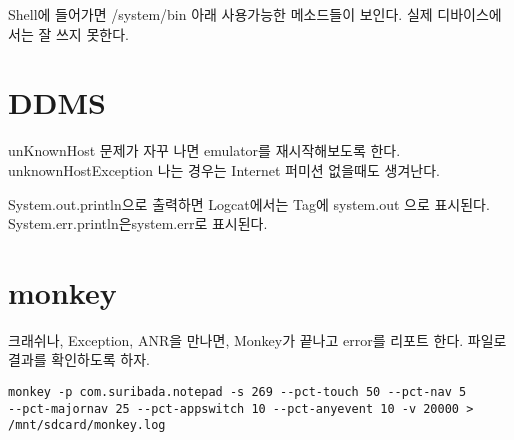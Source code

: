 Shell에 들어가면 /system/bin 아래 사용가능한 메소드들이 보인다. 실제 디바이스에서는 잘 쓰지 못한다.

\section{DDMS}
unKnownHost 문제가 자꾸 나면 emulator를 재시작해보도록 한다.
unknownHostException 나는 경우는 Internet 퍼미션 없을때도 생겨난다.

System.out.println으로 출력하면 Logcat에서는 Tag에 system.out 으로 표시된다.
System.err.println은system.err로 표시된다.

\section{monkey}
크래쉬나, Exception, ANR을 만나면, Monkey가 끝나고 error를 리포트 한다.
파일로 결과를 확인하도록 하자.
\begin{verbatim}
monkey -p com.suribada.notepad -s 269 --pct-touch 50 --pct-nav 5 
--pct-majornav 25 --pct-appswitch 10 --pct-anyevent 10 -v 20000 > /mnt/sdcard/monkey.log
\end{verbatim}

